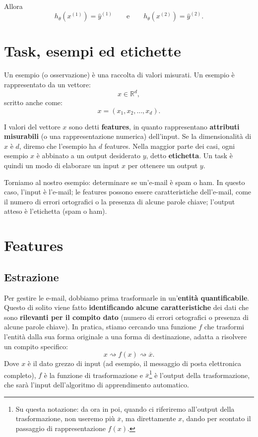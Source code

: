 \noindent
Allora
\[
h_\theta(x^{(1)}) = \hat{y}^{(1)}
\qquad \text{e} \qquad
h_\theta(x^{(2)}) = \hat{y}^{(2)}.
\]

\section{Task, esempi ed etichette}

Un esempio (o osservazione) \`e una raccolta di valori misurati. Un esempio \`e rappresentato da un vettore:
\[
x \in \mathbb{R}^{d},
\]
scritto anche come:
\[
x = (x_1, x_2, \dots, x_d).
\]

I valori del vettore $x$ sono detti \textbf{features}, in quanto rappresentano \textbf{attributi misurabili} (o una rappresentazione numerica) dell'input. Se la dimensionalit\`a di $x$ \`e $d$, diremo che l'esempio ha $d$ features. Nella maggior parte dei casi, ogni esempio $x$ \`e abbinato a un output desiderato $y$, detto \textbf{etichetta}. Un task \`e quindi un modo di elaborare un input $x$ per ottenere un output $y$.

Torniamo al nostro esempio: determinare se un'e-mail \`e spam o ham. In questo caso, l'input \`e l'e-mail; le features possono essere caratteristiche dell'e-mail, come il numero di errori ortografici o la presenza di alcune parole chiave; l'output atteso \`e l'etichetta (spam o ham).

\section{Features}

\subsection{Estrazione}

Per gestire le e-mail, dobbiamo prima trasformarle in un'\textbf{entit\`a quantificabile}. Questo di solito viene fatto \textbf{identificando alcune caratteristiche} dei dati che sono \textbf{rilevanti per il compito dato} (numero di errori ortografici o presenza di alcune parole chiave). In pratica, stiamo cercando una funzione $f$ che trasformi l'entit\`a dalla sua forma originale a una forma di destinazione, adatta a risolvere un compito specifico:
\[
x \rightsquigarrow f(x) \rightsquigarrow \overline{x}.
\]
Dove $x$ \`e il dato grezzo di input (ad esempio, il messaggio di posta elettronica completo), $f$ \`e la funzione di trasformazione e $\overline{x}$\footnote{Su questa notazione: da ora in poi, quando ci riferiremo all'output della trasformazione, non useremo pi\`u $\overline{x}$, ma direttamente $x$, dando per scontato il passaggio di rappresentazione $f(x)$.} \`e l'output della trasformazione, che sar\`a l'input dell'algoritmo di apprendimento automatico.

